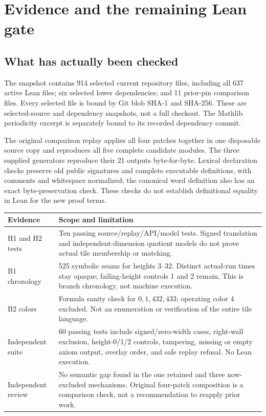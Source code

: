 \section{Evidence and the remaining Lean gate}

\subsection{What has actually been checked}
The snapshot contains 914 selected current repository files, including all 637 active Lean files; six selected lower dependencies; and 11 prior-pin comparison files. Every selected file is bound by Git blob SHA-1 and SHA-256. These are selected-source and dependency snapshots, not a full checkout. The Mathlib periodicity excerpt is separately bound to its recorded dependency commit.

The original comparison replay applies all four patches together in one disposable source copy and reproduces all five complete candidate modules. The three supplied generators reproduce their 21 outputs byte-for-byte. Lexical declaration checks preserve old public signatures and complete executable definitions, with comments and whitespace normalized; the canonical word definition also has an exact byte-preservation check. These checks do not establish definitional equality in Lean for the new proof terms.

\begin{tabularx}{\linewidth}{@{}L{1.45in}Y@{}}
\toprule
Evidence & Scope and limitation \\
\midrule
H1 and H2 tests & Ten passing source/replay/API/model tests. Signed translation and independent-dimension quotient models do not prove actual tile membership or matching. \\
B1 chronology & 525 symbolic seams for heights 3--32. Distinct actual-run times stay opaque; failing-height controls 1 and 2 remain. This is branch chronology, not machine execution. \\
B2 colors & Formula sanity check for $0,1,432,433$; operating color 4 excluded. Not an enumeration or verification of the entire tile language. \\
Independent suite & 60 passing tests include signed/zero-width cases, right-wall exclusion, height-0/1/2 controls, tampering, missing or empty axiom output, overlay order, and safe replay refusal. No Lean execution. \\
Independent review & No semantic gap found in the one retained and three now-excluded mechanisms. Original four-patch composition is a comparison check, not a recommendation to reapply prior work. \\
\bottomrule
\end{tabularx}

